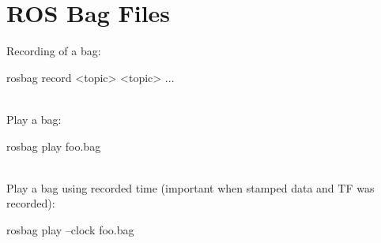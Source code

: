 \section{ROS Bag Files}
Recording of a bag:
\begin{tt}rosbag record <topic> <topic> ...\end{tt}\\
Play a bag:
\begin{tt}rosbag play foo.bag\end{tt}\\
Play a bag using recorded time (important when stamped data and
TF was recorded):\\
\begin{tt}rosbag play --clock foo.bag\end{tt}

